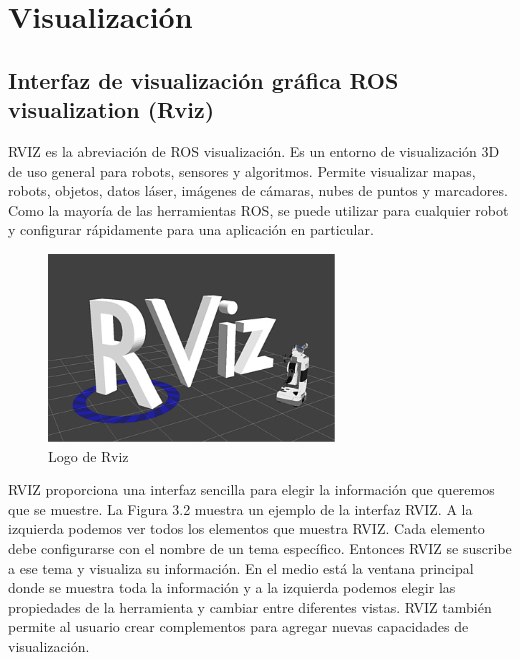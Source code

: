     
        \newpage    



\section{Visualización}
    
    \subsection{Interfaz de visualización gráfica ROS visualization (Rviz)}

        RVIZ es la abreviación de ROS visualización. Es un entorno de visualización 3D de uso general para robots, sensores y algoritmos. Permite visualizar mapas, robots, objetos, datos láser, imágenes de cámaras, nubes de puntos y marcadores.   Como la mayoría de las herramientas ROS, se puede utilizar para cualquier robot y configurar rápidamente para una aplicación en particular.
        
        \begin{figure}[htb]
            \centering
            \includegraphics[width=0.35\linewidth]{Main/Chapter3/Images3/3-6/logo-rviz.png}
            \caption{Logo de Rviz}
            \label{f:Cap3-6_logo_rviz}
        \end{figure}
        
        RVIZ proporciona una interfaz sencilla para elegir la información que queremos que se muestre. La Figura 3.2 muestra un ejemplo de la interfaz RVIZ. A la izquierda podemos ver todos los elementos que muestra RVIZ. Cada elemento debe configurarse con el nombre de un tema específico. Entonces RVIZ se suscribe a ese tema y visualiza su información. En el medio está la ventana principal donde se muestra toda la información y a la izquierda podemos elegir las propiedades de la herramienta y cambiar entre diferentes vistas. RVIZ también permite al usuario crear complementos para agregar nuevas capacidades de visualización.
        
